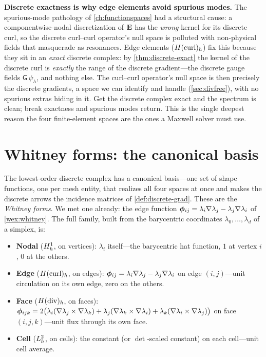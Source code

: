 \begin{keyidea}
\textbf{Discrete exactness is why edge elements avoid spurious modes.} The
spurious-mode pathology of \cref{ch:functionspaces} had a structural cause: a
componentwise-nodal discretization of $\mathbf{E}$ has the \emph{wrong} kernel for its
discrete curl, so the discrete curl--curl operator's null space is polluted with
non-physical fields that masquerade as resonances. Edge elements ($H(\mathrm{curl})_h$) fix
this because they sit in an \emph{exact} discrete complex: by
\cref{thm:discrete-exact} the kernel of the discrete curl is \emph{exactly} the range
of the discrete gradient---the discrete gauge fields $\mathsf{G}\,\psi_h$, and nothing
else. The curl--curl operator's null space is then precisely the discrete gradients,
a space we can identify and handle (\cref{sec:divfree}), with no spurious extras
hiding in it. Get the discrete complex exact and the spectrum is clean; break
exactness and spurious modes return. This is the single deepest reason the four
finite-element spaces are the ones a Maxwell solver must use.
\end{keyidea}

\section{Whitney forms: the canonical basis}
\label{sec:whitney}

The lowest-order discrete complex has a canonical basis---one set of shape functions,
one per mesh entity, that realizes all four spaces at once and makes the discrete
arrows the incidence matrices of \cref{def:discrete-grad}. These are the
\emph{Whitney forms}. We met one already: the edge function
$\boldsymbol\phi_{ij}=\lambda_i\nabla\lambda_j-\lambda_j\nabla\lambda_i$ of
\cref{wex:whitney}. The full family, built from the barycentric coordinates
$\lambda_0,\dots,\lambda_d$ of a simplex, is:

\begin{itemize}[nosep]
\item \textbf{Nodal} ($H^1_h$, on vertices): $\lambda_i$ itself---the barycentric
  hat function, $1$ at vertex $i$, $0$ at the others.
\item \textbf{Edge} ($H(\mathrm{curl})_h$, on edges): $\boldsymbol\phi_{ij}=
  \lambda_i\nabla\lambda_j-\lambda_j\nabla\lambda_i$ on edge $(i,j)$---unit circulation
  on its own edge, zero on the others.
\item \textbf{Face} ($H(\mathrm{div})_h$, on faces): $\boldsymbol\phi_{ijk}=
  2\bigl(\lambda_i(\nabla\lambda_j\times\nabla\lambda_k)
  +\lambda_j(\nabla\lambda_k\times\nabla\lambda_i)
  +\lambda_k(\nabla\lambda_i\times\nabla\lambda_j)\bigr)$ on face $(i,j,k)$---unit flux
  through its own face.
\item \textbf{Cell} ($L^2_h$, on cells): the constant (or $\det$-scaled constant)
  on each cell---unit cell average.
\end{itemize}

